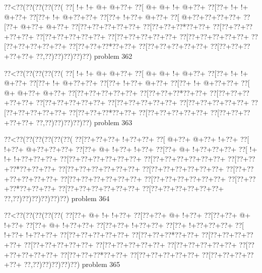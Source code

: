 \vbox{\vbox{\goo
\0??<\0??(\0??(\0??(\0??(\0??(
\0??[\- !+\- !+\- @+\- @+\0??+
\0??[\- @+\- @+\- !+\- @+\0??+
\0??[\0??+\- !+\- !+\- @+\0??+
\0??[\0??+\- !+\- @+\0??+\0??+
\0??[\0??+\- !+\0??+\- @+\0??+
\0??[\- @+\0??+\0??+\0??+\0??+
\0??[\0??+\- @+\0??+\- @+\0??+
\0??[\0??+\0??+\0??+\0??+\0??+
\0??[\0??+\0??+\0??*\0??+\0??+
\0??[\0??+\0??+\0??+\0??+\0??+
\0??[\0??+\0??+\0??+\0??+\0??+
\0??[\0??+\0??+\0??+\0??+\0??+
\0??[\0??+\0??+\0??+\0??+\0??+
\0??[\0??+\0??+\0??+\0??+\0??+
\0??[\0??+\0??+\0??*\0??+\0??+
\0??[\0??+\0??+\0??+\0??+\0??+
\0??[\0??+\0??+\0??+\0??+\0??+
\0??,\0??)\0??)\0??)\0??)\0??)
}
\hfil problem 362\hfil\break
}

\vbox{\vbox{\goo
\0??<\0??(\0??(\0??(\0??(\0??(
\0??[\- !+\- !+\- @+\- @+\0??+
\0??[\- @+\- @+\- !+\- @+\0??+
\0??[\0??+\- !+\- !+\- @+\0??+
\0??[\0??+\- !+\- @+\0??+\0??+
\0??[\0??+\- !+\0??+\- @+\0??+
\0??[\0??+\- !+\- @+\0??+\0??+
\0??[\- @+\- @+\0??+\- @+\0??+
\0??[\0??+\0??+\0??+\0??+\0??+
\0??[\0??+\0??+\0??*\0??+\0??+
\0??[\0??+\0??+\0??+\0??+\0??+
\0??[\0??+\0??+\0??+\0??+\0??+
\0??[\0??+\0??+\0??+\0??+\0??+
\0??[\0??+\0??+\0??+\0??+\0??+
\0??[\0??+\0??+\0??+\0??+\0??+
\0??[\0??+\0??+\0??*\0??+\0??+
\0??[\0??+\0??+\0??+\0??+\0??+
\0??[\0??+\0??+\0??+\0??+\0??+
\0??,\0??)\0??)\0??)\0??)\0??)
}
\hfil problem 363\hfil\break
}

\vbox{\vbox{\goo
\0??<\0??(\0??(\0??(\0??(\0??(\0??(
\0??[\0??+\0??+\0??+\- !+\0??+\0??+
\0??[\- @+\0??+\- @+\0??+\- !+\0??+
\0??[\- !+\0??+\- @+\0??+\0??+\0??+
\0??[\0??+\- @+\- !+\0??+\- !+\0??+
\0??[\0??+\- @+\- !+\0??+\0??+\0??+
\0??[\- !+\- !+\- !+\0??+\0??+\0??+
\0??[\0??+\0??+\0??+\0??+\0??+\0??+
\0??[\0??+\0??+\0??+\0??+\0??+\0??+
\0??[\0??+\0??+\0??*\0??+\0??+\0??+
\0??[\0??+\0??+\0??+\0??+\0??+\0??+
\0??[\0??+\0??+\0??+\0??+\0??+\0??+
\0??[\0??+\0??+\0??+\0??+\0??+\0??+
\0??[\0??+\0??+\0??+\0??+\0??+\0??+
\0??[\0??+\0??+\0??+\0??+\0??+\0??+
\0??[\0??+\0??+\0??*\0??+\0??+\0??+
\0??[\0??+\0??+\0??+\0??+\0??+\0??+
\0??[\0??+\0??+\0??+\0??+\0??+\0??+
\0??,\0??)\0??)\0??)\0??)\0??)\0??)
}
\hfil problem 364\hfil\break
}

\vbox{\vbox{\goo
\0??<\0??(\0??(\0??(\0??(\0??(
\0??[\0??+\- @+\- !+\- !+\0??+
\0??[\0??+\0??+\- @+\- !+\0??+
\0??[\0??+\0??+\- @+\- !+\0??+
\0??[\0??+\- @+\- !+\0??+\0??+
\0??[\0??+\0??+\- !+\0??+\0??+
\0??[\0??+\- !+\0??+\0??+\0??+
\0??[\- !+\0??+\- !+\0??+\0??+
\0??[\0??+\0??+\0??+\0??+\0??+
\0??[\0??+\0??+\0??*\0??+\0??+
\0??[\0??+\0??+\0??+\0??+\0??+
\0??[\0??+\0??+\0??+\0??+\0??+
\0??[\0??+\0??+\0??+\0??+\0??+
\0??[\0??+\0??+\0??+\0??+\0??+
\0??[\0??+\0??+\0??+\0??+\0??+
\0??[\0??+\0??+\0??*\0??+\0??+
\0??[\0??+\0??+\0??+\0??+\0??+
\0??[\0??+\0??+\0??+\0??+\0??+
\0??,\0??)\0??)\0??)\0??)\0??)
}
\hfil problem 365\hfil\break
}

